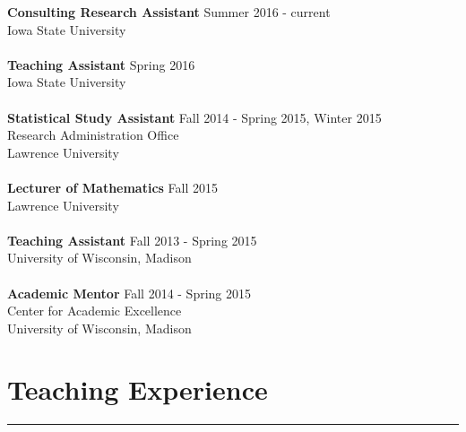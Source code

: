 \documentclass[11pt, oneside]{article}
\begin{document}
\textbf{Consulting Research Assistant} \hfill{Summer 2016 - current}\\
Iowa State University\\
\\
\textbf{Teaching Assistant} \hfill{Spring 2016}\\
Iowa State University\\
\\
\textbf{Statistical Study Assistant} \hfill{Fall 2014 - Spring 2015, Winter 2015}\\
Research Administration Office\\
Lawrence University\\
\\
\textbf{Lecturer of Mathematics} \hfill{Fall 2015}\\
Lawrence University\\
\\
\textbf{Teaching Assistant} \hfill{Fall 2013 - Spring 2015}\\
University of Wisconsin, Madison\\
\\
\textbf{Academic Mentor} \hfill{Fall 2014 - Spring 2015}\\
Center for Academic Excellence\\
University of Wisconsin, Madison\\

\newpage

\section*{Teaching Experience}
\hrule
\vspace{0.5cm}
\end{document}
